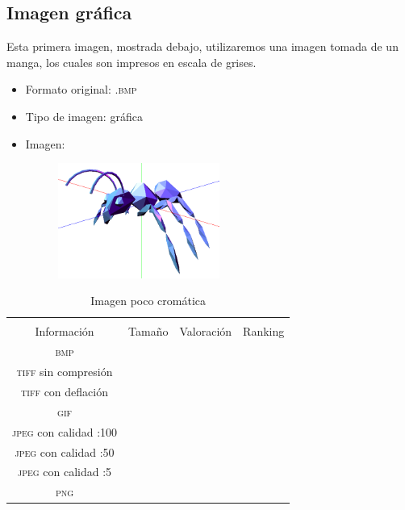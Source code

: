 \documentclass[11pt,a4paper]{article}
\begin{document}
\subsection{Imagen gráfica}

Esta primera imagen, mostrada debajo, utilizaremos una imagen tomada de un manga, los cuales son impresos en escala de grises.

\begin{itemize}
	\item Formato original: \textsc{.bmp}
	\item Tipo de imagen: gráfica
	\item Imagen:
		\begin{figure}[H]
		\centering
			\includegraphics[width=0.5\textwidth]{Fotos/graficos.png}
		\end{figure}	
\end{itemize}

\begin{table}[H]
\centering
\begin{tabular}{|c|c|c|c|}
\hline
\diagbox[width=15em]{\textit{Códec}/Formato}{\\Información} & Tamaño & Valoración & Ranking \\
\hline
\textsc{bmp} &  &  &  \\ \hline
\textsc{tiff} sin compresión &  &  &  \\ \hline
\textsc{tiff} con deflación &  &  &  \\ \hline
\textsc{gif} &  &  &  \\ \hline
\textsc{jpeg} con calidad :100 &  &  &  \\ \hline
\textsc{jpeg} con calidad :50 &  &  &  \\ \hline
\textsc{jpeg} con calidad :5 &  &  &  \\ \hline
\textsc{png} &  &  &  \\ \hline
\end{tabular}
\caption{Imagen poco cromática}
\label{tab:my-table}
\end{table}
\end{document}
